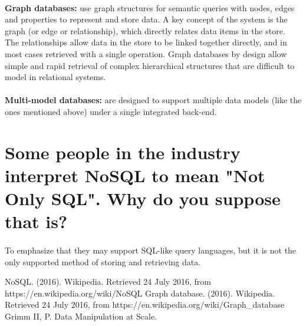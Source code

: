 \documentclass[11pt, a4paper]{article}
\begin{document}
\paragraph{}\textbf{Graph databases:} use graph structures for semantic queries with nodes, edges and properties to represent and store data. A key concept of the system is the graph (or edge or relationship), which directly relates data items in the store. The relationships allow data in the store to be linked together directly, and in most cases retrieved with a single operation. Graph databases by design allow simple and rapid retrieval of complex hierarchical structures that are difficult to model in relational systems.
\paragraph{}\textbf{Multi-model databases:} are designed to support multiple data models (like the ones mentioned above) under a single integrated back-end.

\section{Some people in the industry interpret NoSQL to mean "Not Only SQL".  Why do you suppose that is?}
\paragraph{}To emphasize that they may support SQL-like query languages, but it is not the only supported method of storing and retrieving data.



\begin{thebibliography}{1}
NoSQL. (2016). Wikipedia. Retrieved 24 July 2016, from https://en.wikipedia.org/wiki/NoSQL
Graph database. (2016). Wikipedia. Retrieved 24 July 2016, from https://en.wikipedia.org/wiki/Graph\_database
Grimm II, P. Data Manipulation at Scale.
\end{thebibliography}
\end{document}
